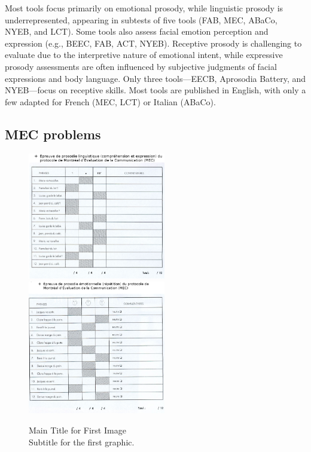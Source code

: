 Most tools focus primarily on emotional prosody, while linguistic prosody is underrepresented, appearing in subtests of five tools (FAB, MEC, ABaCo, NYEB, and LCT). Some tools also assess facial emotion perception and expression (e.g., BEEC, FAB, ACT, NYEB). Receptive prosody is challenging to evaluate due to the interpretive nature of emotional intent, while expressive prosody assessments are often influenced by subjective judgments of facial expressions and body language. Only three tools—EECB, Aprosodia Battery, and NYEB—focus on receptive skills.
Most tools are published in English, with only a few adapted for French (MEC, LCT) or Italian (ABaCo). \cite{benedetti_assessment_2022}

\subsection {MEC problems} 
\begin{figure}[ht!]
    \centering
    \includegraphics[width=6cm]{MainLayout/Images/mec_c.png}
    \includegraphics[width=6cm]{MainLayout/Images/mec_r.png}
    \caption{Main Title for First Image \\ \small Subtitle for the first graphic.}
    \label{fig:mec_c}
\end{figure}  

